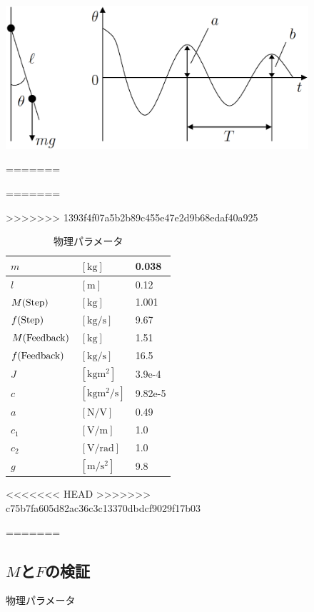 \documentclass[a4j,11pt,twoside]{ujbook}
\begin{document}
\begin{figure}[htbp]
	\begin{center}
		\includegraphics[width = 0.7 \linewidth]{measure_jc.eps}
		\caption{振子の自由振動}
		\label{fig:振子の自由振動}
=======
\begin{table}[hbtp]
	\begin{center}
=======
\begin{table}[hbtp]
	\begin{center}
>>>>>>> 1393f4f07a5b2b89c455e47e2d9b68edaf40a925
		\caption{物理パラメータ}
		\medskip
		\begin{tabular}{|ll|l|} \hline
			$m$ & $[\mathrm{kg}]$ & 0.038 \\ \hline
			$l$ & $[\mathrm{m}]$ & 0.12 \\ \hline
			$M(\rm{Step})$ & $[\mathrm{kg}]$ & 1.001 \\ \hline
			$f(\rm{Step})$ & $[\mathrm{kg/s}]$ & 9.67 \\ \hline
			$M(\rm{Feedback})$ & $[\mathrm{kg}]$ & 1.51 \\ \hline
			$f(\rm{Feedback})$ & $[\mathrm{kg/s}]$ & 16.5 \\ \hline
			$J$ & $[\mathrm{kgm^2}]$ & 3.9e-4 \\ \hline
			$c$ & $[\mathrm{kgm^2/s}]$ & 9.82e-5 \\ \hline
			$a$ & $[\mathrm{N/V}]$ & 0.49 \\ \hline
			$c_1$ & $[\mathrm{V/m}]$ & 1.0 \\ \hline
			$c_2$ & $[\mathrm{V/rad}]$ & 1.0 \\ \hline
			$g$ & $[\mathrm{m/s^2}]$ & 9.8 \\ \hline
		\end{tabular}
<<<<<<< HEAD
>>>>>>> c75b7fa605d82ac36c3c13370dbdcf9029f17b03
	\end{center}
\end{table}
=======
	\end{center}
\end{table}

	\subsection{$M$と$F$の検証}


\end{center}
\end{figure}
\end{document}
